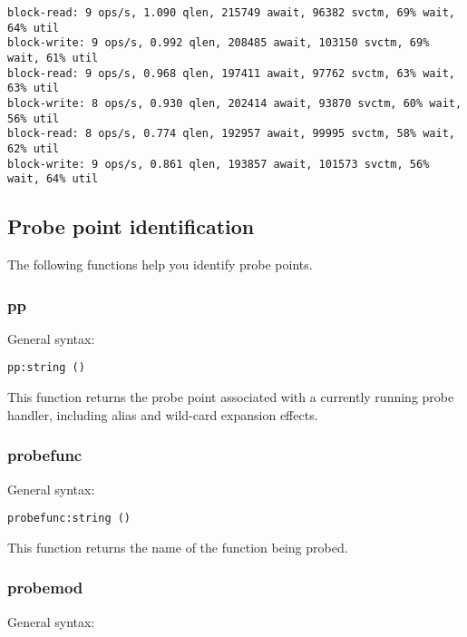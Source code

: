 \documentclass[twoside,english]{article}
\newenvironment{vindent}
{\begin{list}{}{\setlength{\listparindent}{6pt}}
\item[]}
{\end{list}}
\begin{document}
\begin{vindent}
\begin{verbatim}
block-read: 9 ops/s, 1.090 qlen, 215749 await, 96382 svctm, 69% wait, 64% util
block-write: 9 ops/s, 0.992 qlen, 208485 await, 103150 svctm, 69% wait, 61% util
block-read: 9 ops/s, 0.968 qlen, 197411 await, 97762 svctm, 63% wait, 63% util
block-write: 8 ops/s, 0.930 qlen, 202414 await, 93870 svctm, 60% wait, 56% util
block-read: 8 ops/s, 0.774 qlen, 192957 await, 99995 svctm, 58% wait, 62% util
block-write: 9 ops/s, 0.861 qlen, 193857 await, 101573 svctm, 56% wait, 64% util
\end{verbatim}
\end{vindent}

\subsection{Probe point identification}

The following functions help you identify probe points.


\subsubsection{pp}
General syntax:

\begin{vindent}
\begin{verbatim}
pp:string ()
\end{verbatim}
\end{vindent}
This function returns the probe point associated with a currently running
probe handler, including alias and wild-card expansion effects.


\subsubsection{probefunc}
General syntax:

\begin{vindent}
\begin{verbatim}
probefunc:string ()
\end{verbatim}
\end{vindent}
This function returns the name of the function being probed.


\subsubsection{probemod}
General syntax:
\end{document}
